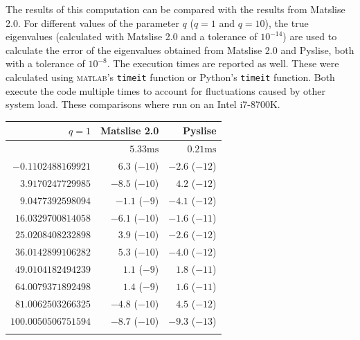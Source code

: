 The results of this computation can be compared with the results from
Matslise 2.0. For different values of the parameter \(q\) (\(q = 1\) and
\(q = 10\)), the true eigenvalues (calculated with Matslise 2.0 and a
tolerance of \(10^{-14}\)) are used to calculate the error of the
eigenvalues obtained from Matslise 2.0 and Pyslise, both with a
tolerance of \(10^{-8}\). The execution times are reported as well.
These were calculated using \textsc{matlab}'s \texttt{timeit} function or Python's \texttt{timeit} function. Both execute the code multiple times to account for fluctuations caused by other system load. These comparisons where run on an Intel i7-8700K.

\begin{table}
  \begin{center}
    \begin{tabular}[]{rrr}
      \toprule
      $q=1$               & Matslise 2.0    & Pyslise         \\
      \midrule
                          & $5.33\text{ms}$ & $0.21\text{ms}$ \\
      $-0.1102488169921$  & $6.3$ ($-10$)   & $-2.6$ ($-12$)  \\
      $3.9170247729985$   & $-8.5$ ($-10$)  & $4.2$ ($-12$)   \\
      $9.0477392598094$   & $-1.1$ ($-9$)   & $-4.1$ ($-12$)  \\
      $16.0329700814058$  & $-6.1$ ($-10$)  & $-1.6$ ($-11$)  \\
      $25.0208408232898$  & $3.9$ ($-10$)   & $-2.6$ ($-12$)  \\
      $36.0142899106282$  & $5.3$ ($-10$)   & $-4.0$ ($-12$)  \\
      $49.0104182494239$  & $1.1$ ($-9$)    & $1.8$ ($-11$)   \\
      $64.0079371892498$  & $1.4$ ($-9$)    & $1.6$ ($-11$)   \\
      $81.0062503266325$  & $-4.8$ ($-10$)  & $4.5$ ($-12$)   \\
      $100.0050506751594$ & $-8.7$ ($-10$)  & $-9.3$ ($-13$)  \\
                          &                 &                 \\
      \bottomrule
    \end{tabular}
  \end{center}



\end{table}
